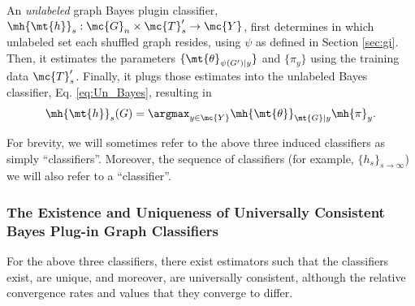 \documentclass[10pt,journal,cspaper,compsoc]{IEEEtran}
\begin{document}
An \emph{unlabeled} graph Bayes plugin classifier,
$\mh{\mt{h}}_s: \mc{G}_n \times \mc{T}_s' \to \mc{Y}$,
first determines in which unlabeled set each shuffled graph resides, using $\psi$ as defined in Section \ref{sec:gi}.  Then, it estimates the parameters $\{\mt{\theta}_{\psi(G')|y}\}$ and $\{\pi_y\}$ using the training data $\mc{T}_s'$. Finally, it plugs those estimates into the unlabeled Bayes classifier, Eq. \eqref{eq:Un_Bayes}, resulting in
\begin{align} \label{eq:Sh_Plug}
	\mh{\mt{h}}_s(G)=\argmax_{y\in\mc{Y}} \mh{\mt{\theta}}_{\mt{G}|y}\mh{\pi}_y.
\end{align}


For brevity, we will sometimes refer to the above three induced classifiers as simply ``classifiers''.  Moreover, the sequence of classifiers (for example, $\{h_s\}_{s \to \infty}$) we will also refer to a ``classifier''. 

\subsubsection{The Existence and Uniqueness of Universally Consistent Bayes Plug-in Graph Classifiers} %
\label{sub:bayes_plug_in_classifiers_are_consistent}



For the above three classifiers, there exist estimators such that the classifiers exist, are unique, and moreover, are universally consistent, although the relative convergence rates and values that they converge to differ.
\end{document}
